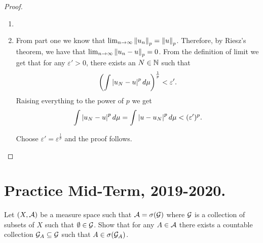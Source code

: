 \begin{proof}$ $\newline
	\begin{enumerate}
		\item 
		\item From part one we know that $\lim_{n\to\infty} \left\Vert{u_n}\right\Vert_p = \left\Vert{u}\right\Vert_p$. Therefore, by Riesz's theorem, we have that $\lim_{n\to\infty}\left\Vert{u_n - u}\right\Vert_p = 0$. From the definition of limit we get that for any $\varepsilon' > 0$, there exists an $N \in \mathbb{N}$ such that
		\begin{align*}
		\left( \int \left\vert{u_N - u}\right\vert^p d\mu \right)^{\frac{1}{p}} < \varepsilon'.
		\end{align*}
		Raising everything to the power of $p$ we get
		\begin{align*}
		\int \left\vert{u_N - u}\right\vert^p d\mu = \int \left\vert{u - u_N}\right\vert^p d\mu < (\varepsilon')^p.
		\end{align*}
		
		Choose $\varepsilon' = \varepsilon^{\frac{1}{p}}$ and the proof follows.
	\end{enumerate}
\end{proof}


\section{Practice Mid-Term, 2019-2020.}

\begin{ex}
	Let $(X, \mathcal{A})$ be a measure space such that $\mathcal{A} = \sigma(\mathcal{G})$ where $\mathcal{G}$ is a collection of subsets of $X$ such that $\emptyset \in \mathcal{G}$. Show that for any $A \in \mathcal{A}$ there exists a countable collection $\mathcal{G}_A \subseteq \mathcal{G}$ such that $A \in \sigma(\mathcal{G}_A)$.
\end{ex}

